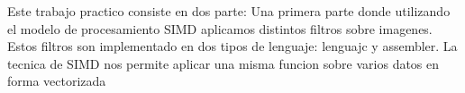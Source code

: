 Este trabajo practico consiste en dos parte: 
Una primera parte donde utilizando el modelo de procesamiento SIMD aplicamos distintos filtros sobre imagenes. Estos filtros son implementado en dos tipos de lenguaje: lenguajc y assembler.
La tecnica de SIMD nos permite aplicar una misma funcion sobre varios datos en forma vectorizada